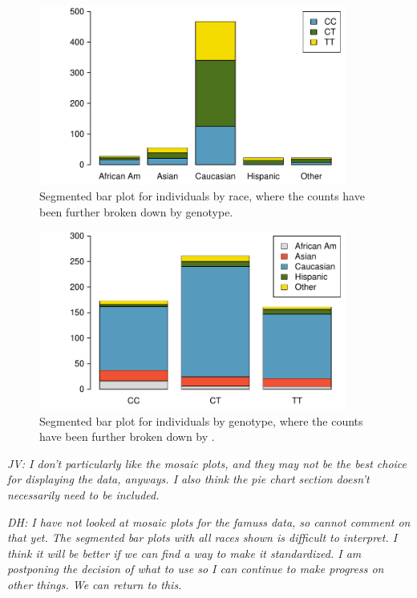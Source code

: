 \begin{doublespace}
\begin{figure}[h!]
\includegraphics[width=0.9\textwidth]{ch_intro_to_data_oi_biostat/figures/famussSegBar/famussSegBarTest} 
\caption{Segmented bar plot for individuals by race, where the counts have been further broken down by genotype.}
\label{famussSegBarTest}
\end{figure}

\begin{figure}[h!]
\includegraphics[width=0.9\textwidth]{ch_intro_to_data_oi_biostat/figures/famussSegBar/famussSegBarTestB}
\caption{Segmented bar plot for individuals by genotype, where the counts have been further broken down by .}
\label{famussSegBarTestB}
\end{figure}

\textit{JV: I don't particularly like the mosaic plots, and they may not be the best choice for displaying the  data, anyways. I also think the pie chart section doesn't necessarily need to be included. }

\textit{DH: I have not looked at mosaic plots for the famuss data, so cannot comment on that yet. The segmented bar plots with all races shown is difficult to interpret.  I think it will be better if we can find a way to make it standardized.  I am postponing the decision of what to use so I can continue to make progress on other things.  We can return to this. }


\end{doublespace}
